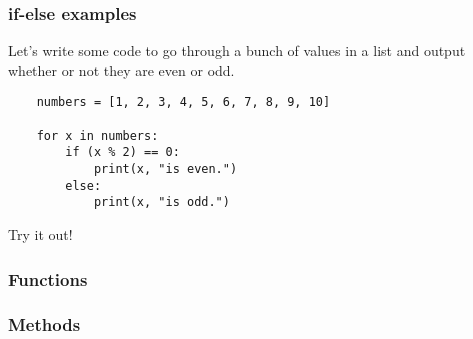 \documentclass[notes]{beamer}
\begin{document}
\begin{frame}[fragile]
    \frametitle{if-else examples}

    Let's write some code to go through a bunch of values in a list and output whether or not they are even or odd.
    
	\pause
	\begin{lstlisting}
	numbers = [1, 2, 3, 4, 5, 6, 7, 8, 9, 10]

	for x in numbers:
	    if (x % 2) == 0:
	        print(x, "is even.")
	    else:
	        print(x, "is odd.")
	\end{lstlisting}
	\pause
	Try it out!
\end{frame}

\begin{frame}[fragile]
	\frametitle{}
	
\end{frame}

\begin{frame}[fragile]
	\frametitle{Functions}
\end{frame}

\begin{frame}[fragile]
	\frametitle{Methods}
\end{frame}
\end{document}
